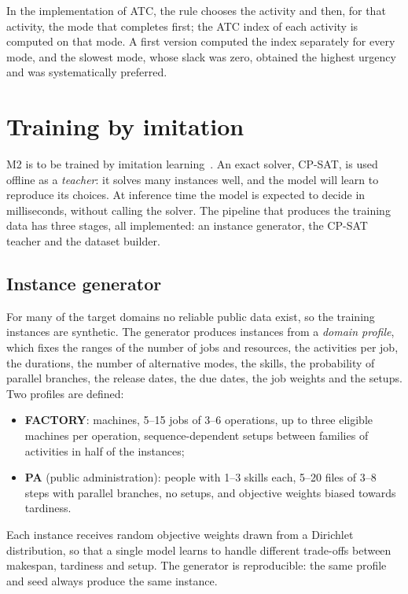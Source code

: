 In the implementation of ATC, the rule chooses the activity and then, for that activity, the
mode that completes first; the ATC index of each activity is computed on that mode. A first
version computed the index separately for every mode, and the slowest mode, whose slack was
zero, obtained the highest urgency and was systematically preferred.

\section{Training by imitation}
\label{sec:imitation}

M2 is to be trained by imitation learning~\cite{hussein2017imitation}. An exact solver, CP-SAT,
is used offline as a \emph{teacher}: it solves many instances well, and the model will learn to
reproduce its choices. At inference time the model is expected to decide in milliseconds,
without calling the solver. The pipeline that produces the training data has three stages, all
implemented: an instance generator, the CP-SAT teacher and the dataset builder.

\subsection{Instance generator}
\label{sec:generator}

For many of the target domains no reliable public data exist, so the training instances are
synthetic. The generator produces instances from a \emph{domain profile}, which fixes the ranges
of the number of jobs and resources, the activities per job, the durations, the number of
alternative modes, the skills, the probability of parallel branches, the release dates, the due
dates, the job weights and the setups. Two profiles are defined:
\begin{itemize}
  \item \textbf{FACTORY}: machines, 5--15 jobs of 3--6 operations, up to three eligible machines
        per operation, sequence-dependent setups between families of activities in half of the
        instances;
  \item \textbf{PA} (public administration): people with 1--3 skills each, 5--20 files of 3--8
        steps with parallel branches, no setups, and objective weights biased towards tardiness.
\end{itemize}
Each instance receives random objective weights drawn from a Dirichlet distribution, so that a
single model learns to handle different trade-offs between makespan, tardiness and setup. The
generator is reproducible: the same profile and seed always produce the same instance.

